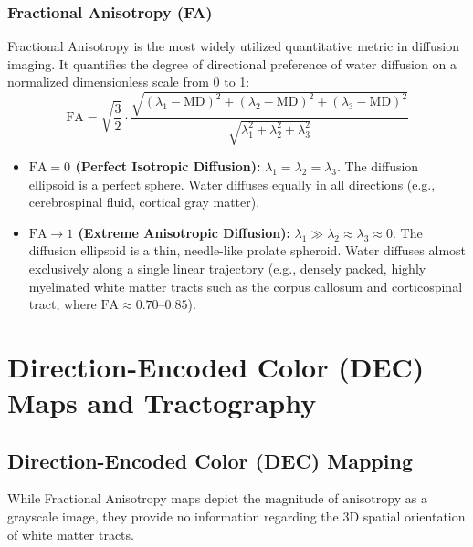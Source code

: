\documentclass[11pt,a4paper]{article}
\begin{document}
\subsubsection{Fractional Anisotropy (FA)}
Fractional Anisotropy is the most widely utilized quantitative metric in diffusion imaging. It quantifies the degree of directional preference of water diffusion on a normalized dimensionless scale from 0 to 1:
\begin{equation}
    \text{FA} = \sqrt{\frac{3}{2}} \cdot \frac{\sqrt{(\lambda_1 - \text{MD})^2 + (\lambda_2 - \text{MD})^2 + (\lambda_3 - \text{MD})^2}}{\sqrt{\lambda_1^2 + \lambda_2^2 + \lambda_3^2}}
\end{equation}
\begin{itemize}[leftmargin=*]
    \item \textbf{$\text{FA} = 0$ (Perfect Isotropic Diffusion):} $\lambda_1 = \lambda_2 = \lambda_3$. The diffusion ellipsoid is a perfect sphere. Water diffuses equally in all directions (e.g., cerebrospinal fluid, cortical gray matter).
    \item \textbf{$\text{FA} \to 1$ (Extreme Anisotropic Diffusion):} $\lambda_1 \gg \lambda_2 \approx \lambda_3 \approx 0$. The diffusion ellipsoid is a thin, needle-like prolate spheroid. Water diffuses almost exclusively along a single linear trajectory (e.g., densely packed, highly myelinated white matter tracts such as the corpus callosum and corticospinal tract, where $\text{FA} \approx 0.70\text{--}0.85$).
\end{itemize}

\newpage
\section{Direction-Encoded Color (DEC) Maps and Tractography}

\subsection{Direction-Encoded Color (DEC) Mapping}

While Fractional Anisotropy maps depict the magnitude of anisotropy as a grayscale image, they provide no information regarding the 3D spatial orientation of white matter tracts.
\end{document}
